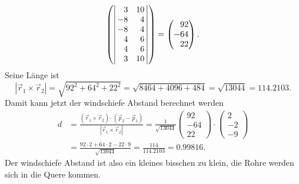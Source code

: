 \begin{loesung}
\begin{align*}
{\begin{pmatrix}
{\left|\,\begin{matrix}\phantom{-}3&          10\\         - 8&\phantom{1}4\end{matrix}\,\right|}\\
{\def\arraystretch{1.0}
\left|\,\begin{matrix}         - 8&\phantom{1}4\\\phantom{-}4&\phantom{1}6\end{matrix}\,\right|}\\
{\def\arraystretch{1.0}
\left|\,\begin{matrix}\phantom{-}4&\phantom{1}6\\\phantom{-}3&          10\end{matrix}\,\right|}
\end{pmatrix}}
=
\begin{pmatrix}
\phantom{-}92\\-64\\\phantom{-}22
\end{pmatrix}.
\end{align*}
Seine Länge ist 
\[
|\vec{r}_1\times\vec{r}_2|
=
\sqrt{92^2+64^2+22^2}=\sqrt{8464+4096+484}=\sqrt{13044}=114.2103.
\]
Damit kann jetzt der windschiefe Abstand berechnet werden
\begin{align*}
d
&=
\frac{(\vec{r}_1\times\vec{r}_2)\cdot (\vec{p}_2 - \vec{p}_1)}{|\vec{r}_1\times \vec{r}_2|}
=
\frac1{\sqrt{13044}}
\begin{pmatrix}92\\-64\\22\end{pmatrix}
\cdot
\begin{pmatrix}2\\-2\\-9 \end{pmatrix}
\\
&=
\frac{92\cdot 2+64\cdot 2-22\cdot 9}{\sqrt{13044}}=\frac{114}{114.2103}=0.99816.
\end{align*}
Der windschiefe Abstand ist also ein kleines bisschen zu klein, die Rohre
werden sich in die Quere kommen.

\end{loesung}
